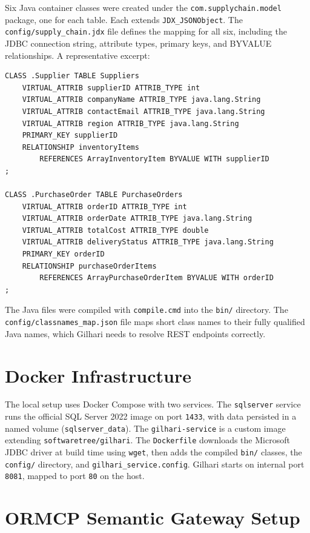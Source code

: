 \documentclass{book}
\begin{document}
Six Java container classes were created under the \texttt{com.supplychain.model} package, one for each table. Each extends \texttt{JDX\_JSONObject}. The \texttt{config/supply\_chain.jdx} file defines the mapping for all six, including the JDBC connection string, attribute types, primary keys, and BYVALUE relationships. A representative excerpt:

\begin{verbatim}
CLASS .Supplier TABLE Suppliers
    VIRTUAL_ATTRIB supplierID ATTRIB_TYPE int
    VIRTUAL_ATTRIB companyName ATTRIB_TYPE java.lang.String
    VIRTUAL_ATTRIB contactEmail ATTRIB_TYPE java.lang.String
    VIRTUAL_ATTRIB region ATTRIB_TYPE java.lang.String
    PRIMARY_KEY supplierID
    RELATIONSHIP inventoryItems
        REFERENCES ArrayInventoryItem BYVALUE WITH supplierID
;

CLASS .PurchaseOrder TABLE PurchaseOrders
    VIRTUAL_ATTRIB orderID ATTRIB_TYPE int
    VIRTUAL_ATTRIB orderDate ATTRIB_TYPE java.lang.String
    VIRTUAL_ATTRIB totalCost ATTRIB_TYPE double
    VIRTUAL_ATTRIB deliveryStatus ATTRIB_TYPE java.lang.String
    PRIMARY_KEY orderID
    RELATIONSHIP purchaseOrderItems
        REFERENCES ArrayPurchaseOrderItem BYVALUE WITH orderID
;
\end{verbatim}

The Java files were compiled with \texttt{compile.cmd} into the \texttt{bin/} directory. The \texttt{config/classnames\_map.json} file maps short class names to their fully qualified Java names, which Gilhari needs to resolve REST endpoints correctly.

\section{Docker Infrastructure}

The local setup uses Docker Compose with two services. The \texttt{sqlserver} service runs the official SQL Server 2022 image on port \texttt{1433}, with data persisted in a named volume (\texttt{sqlserver\_data}). The \texttt{gilhari-service} is a custom image extending \texttt{softwaretree/gilhari}. The \texttt{Dockerfile} downloads the Microsoft JDBC driver at build time using \texttt{wget}, then adds the compiled \texttt{bin/} classes, the \texttt{config/} directory, and \texttt{gilhari\_service.config}. Gilhari starts on internal port \texttt{8081}, mapped to port \texttt{80} on the host.

\section{ORMCP Semantic Gateway Setup}
\end{document}
